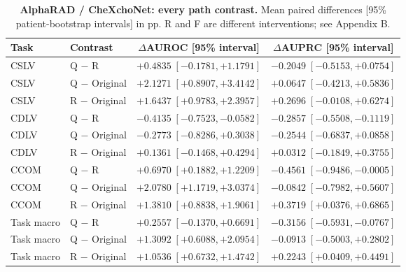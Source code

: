 \begin{table}[tp]
\centering
\caption{\textbf{AlphaRAD / CheXchoNet: every path contrast.} Mean paired differences [95\% patient-bootstrap intervals] in pp. R and F are different interventions; see Appendix B.}
\label{tab:supp-cardiac-path-ci-alpharad}
\small
\setlength{\tabcolsep}{4pt}
\begin{tabular*}{\textwidth}{@{\extracolsep{\fill}}llcc@{}}
\toprule
Task & Contrast & $\Delta$AUROC [95\% interval] & $\Delta$AUPRC [95\% interval] \\
\midrule
CSLV & Q $-$ R & $+0.4835\;[-0.1781,+1.1791]$ & $-0.2049\;[-0.5153,+0.0754]$ \\
CSLV & Q $-$ Original & $+2.1271\;[+0.8907,+3.4142]$ & $+0.0647\;[-0.4213,+0.5836]$ \\
CSLV & R $-$ Original & $+1.6437\;[+0.9783,+2.3957]$ & $+0.2696\;[-0.0108,+0.6274]$ \\
CDLV & Q $-$ R & $-0.4135\;[-0.7523,-0.0582]$ & $-0.2857\;[-0.5508,-0.1119]$ \\
CDLV & Q $-$ Original & $-0.2773\;[-0.8286,+0.3038]$ & $-0.2544\;[-0.6837,+0.0858]$ \\
CDLV & R $-$ Original & $+0.1361\;[-0.1468,+0.4294]$ & $+0.0312\;[-0.1849,+0.3755]$ \\
CCOM & Q $-$ R & $+0.6970\;[+0.1882,+1.2209]$ & $-0.4561\;[-0.9486,-0.0005]$ \\
CCOM & Q $-$ Original & $+2.0780\;[+1.1719,+3.0374]$ & $-0.0842\;[-0.7982,+0.5607]$ \\
CCOM & R $-$ Original & $+1.3810\;[+0.8838,+1.9061]$ & $+0.3719\;[+0.0376,+0.6865]$ \\
Task macro & Q $-$ R & $+0.2557\;[-0.1370,+0.6691]$ & $-0.3156\;[-0.5931,-0.0767]$ \\
Task macro & Q $-$ Original & $+1.3092\;[+0.6088,+2.0954]$ & $-0.0913\;[-0.5003,+0.2802]$ \\
Task macro & R $-$ Original & $+1.0536\;[+0.6732,+1.4742]$ & $+0.2243\;[+0.0409,+0.4491]$ \\
\bottomrule
\end{tabular*}
\end{table}

